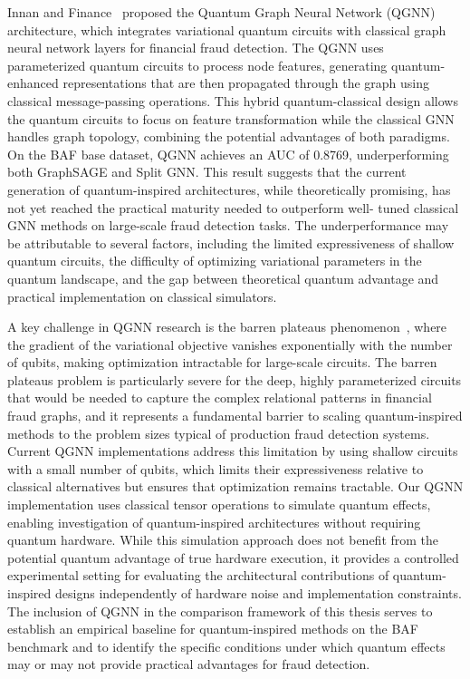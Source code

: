 Innan and Finance~\cite{innan2024quantum} proposed the Quantum Graph Neural
Network (QGNN) architecture, which integrates variational quantum circuits with
classical graph neural network layers for financial fraud detection. The QGNN
uses parameterized quantum circuits to process node features, generating
quantum-enhanced representations that are then propagated through the graph
using classical message-passing operations. This hybrid quantum-classical design
allows the quantum circuits to focus on feature transformation while the
classical GNN handles graph topology, combining the potential advantages of both
paradigms. On the BAF base dataset, QGNN achieves an AUC of 0.8769,
underperforming both GraphSAGE and Split GNN. This result suggests that the
current generation of quantum-inspired architectures, while theoretically
promising, has not yet reached the practical maturity needed to outperform well-
tuned classical GNN methods on large-scale fraud detection tasks. The
underperformance may be attributable to several factors, including the limited
expressiveness of shallow quantum circuits, the difficulty of optimizing
variational parameters in the quantum landscape, and the gap between theoretical
quantum advantage and practical implementation on classical simulators.

A key challenge in QGNN research is the barren plateaus
phenomenon~\cite{mcclean2018barren}, where the gradient of the variational
objective vanishes exponentially with the number of qubits, making optimization
intractable for large-scale circuits. The barren plateaus problem is
particularly severe for the deep, highly parameterized circuits that would be
needed to capture the complex relational patterns in financial fraud graphs, and
it represents a fundamental barrier to scaling quantum-inspired methods to the
problem sizes typical of production fraud detection systems. Current QGNN
implementations address this limitation by using shallow circuits with a small
number of qubits, which limits their expressiveness relative to classical
alternatives but ensures that optimization remains tractable. Our QGNN
implementation uses classical tensor operations to simulate quantum effects,
enabling investigation of quantum-inspired architectures without requiring
quantum hardware. While this simulation approach does not benefit from the
potential quantum advantage of true hardware execution, it provides a controlled
experimental setting for evaluating the architectural contributions of quantum-
inspired designs independently of hardware noise and implementation constraints.
The inclusion of QGNN in the comparison framework of this thesis serves to
establish an empirical baseline for quantum-inspired methods on the BAF
benchmark and to identify the specific conditions under which quantum effects
may or may not provide practical advantages for fraud detection.

